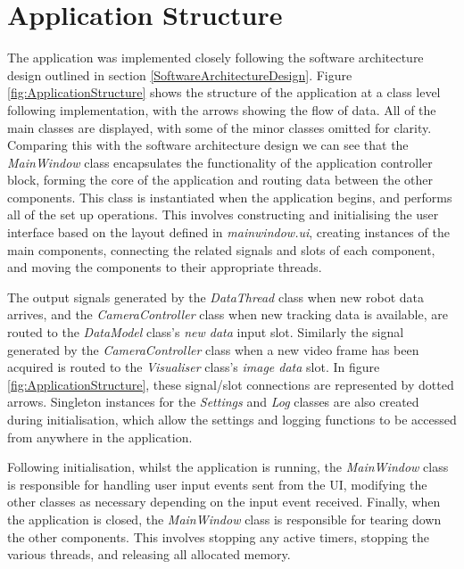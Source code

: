
\section{Application Structure} \label{ApplicationStructure}
The application was implemented closely following the software architecture design outlined in section \ref{SoftwareArchitectureDesign}. Figure \ref{fig:ApplicationStructure} shows the structure of the application at a class level following implementation, with the arrows showing the flow of data. All of the main classes are displayed, with some of the minor classes omitted for clarity. Comparing this with the software architecture design we can see that the \textit{MainWindow} class encapsulates the functionality of the application controller block, forming the core of the application and routing data between the other components. This class is instantiated when the application begins, and performs all of the set up operations. This involves constructing and initialising the user interface based on the layout defined in \textit{mainwindow.ui}, creating instances of the main components, connecting the related signals and slots of each component, and moving the components to their appropriate threads. 

The output signals generated by the \textit{DataThread} class when new robot data arrives, and the \textit{CameraController} class when new tracking data is available, are routed to the \textit{DataModel} class's \textit{new data} input slot. Similarly the signal generated by the \textit{CameraController} class when a new video frame has been acquired is routed to the \textit{Visualiser} class's \textit{image data} slot. In figure \ref{fig:ApplicationStructure}, these signal/slot connections are represented by dotted arrows. Singleton instances for the \textit{Settings} and \textit{Log} classes are also created during initialisation, which allow the settings and logging functions to be accessed from anywhere in the application. 

Following initialisation, whilst the application is running, the \textit{MainWindow} class is responsible for handling user input events sent from the UI, modifying the other classes as necessary depending on the input event received. Finally, when the application is closed, the \textit{MainWindow} class is responsible for tearing down the other components. This involves stopping any active timers, stopping the various threads, and releasing all allocated memory.

